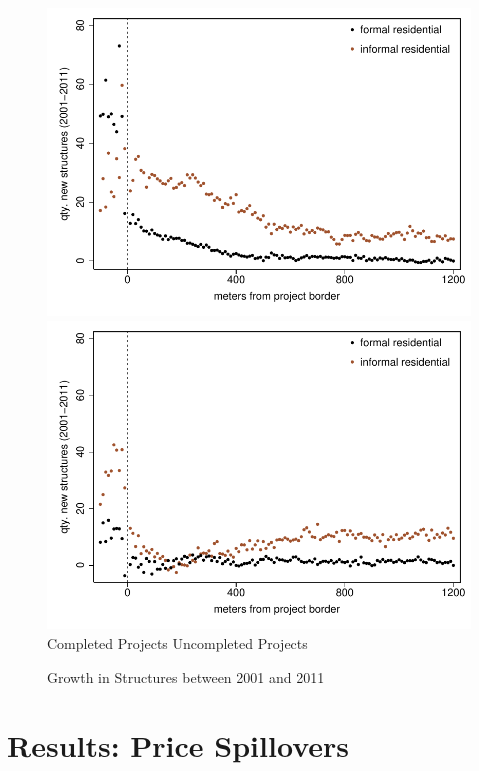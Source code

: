 \documentclass[12pt]{article}
\begin{document}
\begin{figure}
\caption{Growth in Structures between 2001 and 2011}\label{figure:buildingchanges}
\centering
\includegraphics[scale=.58]{figures/bbluplot.pdf}
\includegraphics[scale=.58]{figures/bbluplot_placebo.pdf}\\
\hspace{.7cm} Completed Projects \hspace{4.2cm} Uncompleted Projects
\end{figure}


\section{Results: Price Spillovers}
\end{document}

